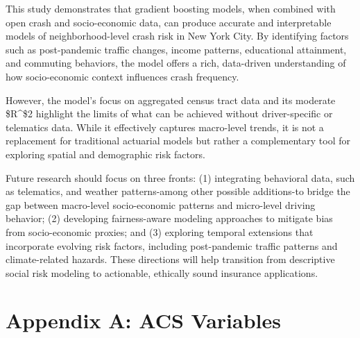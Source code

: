 \documentclass[
  number,
  review,
  3p]{elsarticle}
\begin{document}
This study demonstrates that gradient boosting models, when combined
with open crash and socio-economic data, can produce accurate and
interpretable models of neighborhood-level crash risk in New York City.
By identifying factors such as post-pandemic traffic changes, income
patterns, educational attainment, and commuting behaviors, the model
offers a rich, data-driven understanding of how socio-economic context
influences crash frequency.

However, the model's focus on aggregated census tract data and its
moderate \$R\^{}\$2 highlight the limits of what can be achieved without
driver-specific or telematics data. While it effectively captures
macro-level trends, it is not a replacement for traditional actuarial
models but rather a complementary tool for exploring spatial and
demographic risk factors.

Future research should focus on three fronts: (1) integrating behavioral
data, such as telematics, and weather patterns-among other possible
additions-to bridge the gap between macro-level socio-economic patterns
and micro-level driving behavior; (2) developing fairness-aware modeling
approaches to mitigate bias from socio-economic proxies; and (3)
exploring temporal extensions that incorporate evolving risk factors,
including post-pandemic traffic patterns and climate-related hazards.
These directions will help transition from descriptive social risk
modeling to actionable, ethically sound insurance applications.

\section{Appendix A: ACS Variables}\label{sec-appA}
\end{document}
